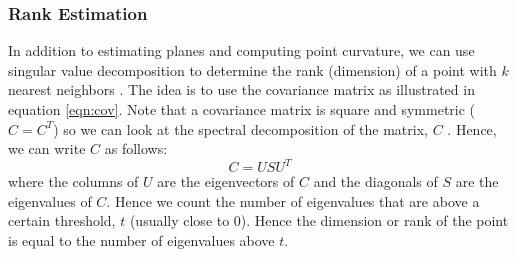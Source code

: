 \documentclass[11pt]{article}
\theoremstyle{definition}
\begin{document}
\subsubsection{Rank Estimation}\label{subsub:rank}
In addition to estimating planes and computing point curvature, we can use singular value decomposition to determine the rank (dimension) of a point with $k$ nearest neighbors \cite{pdal}.  The idea is to use the covariance matrix as illustrated in equation \ref{eqn:cov}.  Note that a covariance matrix is square and symmetric ($C = C^T$) so we can look at the spectral decomposition of the matrix, $C$ \cite{madsen2004singular}.  Hence, we can write $C$ as follows:
\begin{equation}\label{eqn:rank}
C = USU^T
\end{equation}
where the columns of $U$ are the eigenvectors of $C$ and the diagonals of $S$ are the eigenvalues of $C$.  Hence we count the number of eigenvalues that are above a certain threshold, $t$ (usually close to 0).  Hence the dimension or rank of the point is equal to the number of eigenvalues above $t$. 
	\newpage


	
	
\end{document}
